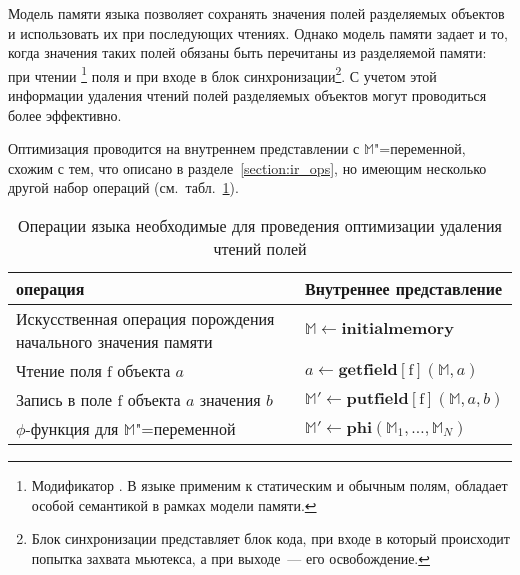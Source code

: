 \documentclass[14pt,titlepage,draft]{extarticle}
\newcommand{\java}{\eng{Java}\xspace}
\newcommand{\M}{\ensuremath{\mathbb{M}}}
\let\mathphi\phi
\renewcommand{\phi}{\ensuremath{\mathphi}}
\newcommand{\field}[1]{\mathrm{#1}}
\newcommand{\op}[1]{\mathbf{#1}}
\begin{document}
    Модель памяти языка \java позволяет сохранять значения полей
    разделяемых объектов и использовать их при последующих чтениях.
    Однако модель памяти задает и то, когда значения таких полей обязаны
    быть перечитаны из разделяемой памяти: при чтении
    \footnote{
      Модификатор . В языке \java применим к статическим и
      обычным полям, обладает особой семантикой в рамках модели памяти.
    } поля и при входе в блок синхронизации\footnote{
      Блок синхронизации представляет блок кода, при входе в который происходит
      попытка захвата мьютекса, а при выходе~--- его освобождение.
    }.
    С учетом этой информации удаления чтений полей разделяемых объектов могут
    проводиться более эффективно.

    Оптимизация проводится на внутреннем представлении с \M"=переменной,
    схожим с тем, что описано в разделе~\ref{section:ir_ops}, но имеющим
    несколько другой набор операций
    (см.~табл.~\ref{tabular:read_elimination_operations}).

    \begin{table}[htb]
      \centering

      \begin{tabular}{|p{}|p{}|}\hline
        \textbf{\java операция} &
          \textbf{Внутреннее представление}\\ \hline

        Искусственная операция порождения начального значения памяти
        & $\M \gets \op{initialmemory}$
        \\ \hline

        Чтение поля $\field{f}$ объекта $a$
        & $a \gets \op{getfield}[\field{f}](\M, a)$
        \\ \hline

        Запись в поле $\field{f}$ объекта $a$ значения $b$
        & $\M' \gets \op{putfield}[\field{f}](\M, a, b)$
        \\ \hline

        \phi-функция для \M"=переменной
        & $\M' \gets \op{phi}(\M_1, \ldots, \M_N)$
        \\ \hline

      \end{tabular}
      \caption{Операции языка \java необходимые для проведения оптимизации
               удаления чтений полей}
      \label{tabular:read_elimination_operations}
    \end{table}
\end{document}
